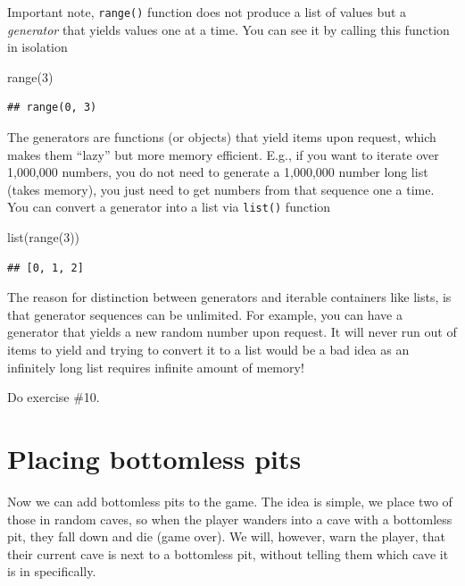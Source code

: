 \documentclass[
]{book}
\newenvironment{Shaded}{\begin{snugshade}}{\end{snugshade}}
\newcommand{\BuiltInTok}[1]{#1}
\newcommand{\DecValTok}[1]{\textcolor[rgb]{0.00,0.00,0.81}{#1}}
\newcommand{\NormalTok}[1]{#1}
\begin{document}
Important note, \texttt{range()} function does not produce a list of values but a \emph{generator} that yields values one at a time. You can see it by calling this function in isolation

\begin{Shaded}
\begin{Highlighting}[]
\BuiltInTok{range}\NormalTok{(}\DecValTok{3}\NormalTok{)}
\end{Highlighting}
\end{Shaded}

\begin{verbatim}
## range(0, 3)
\end{verbatim}

The generators are functions (or objects) that yield items upon request, which makes them ``lazy'' but more memory efficient. E.g., if you want to iterate over 1,000,000 numbers, you do not need to generate a 1,000,000 number long list (takes memory), you just need to get numbers from that sequence one a time. You can convert a generator into a list via \texttt{list()} function

\begin{Shaded}
\begin{Highlighting}[]
\BuiltInTok{list}\NormalTok{(}\BuiltInTok{range}\NormalTok{(}\DecValTok{3}\NormalTok{))}
\end{Highlighting}
\end{Shaded}

\begin{verbatim}
## [0, 1, 2]
\end{verbatim}

The reason for distinction between generators and iterable containers like lists, is that generator sequences can be unlimited. For example, you can have a generator that yields a new random number upon request. It will never run out of items to yield and trying to convert it to a list would be a bad idea as an infinitely long list requires infinite amount of memory!

Do exercise \#10.

\hypertarget{placing-bottomless-pits}{%
\section{Placing bottomless pits}\label{placing-bottomless-pits}}

Now we can add bottomless pits to the game. The idea is simple, we place two of those in random caves, so when the player wanders into a cave with a bottomless pit, they fall down and die (game over). We will, however, warn the player, that their current cave is next to a bottomless pit, without telling them which cave it is in specifically.
\end{document}

